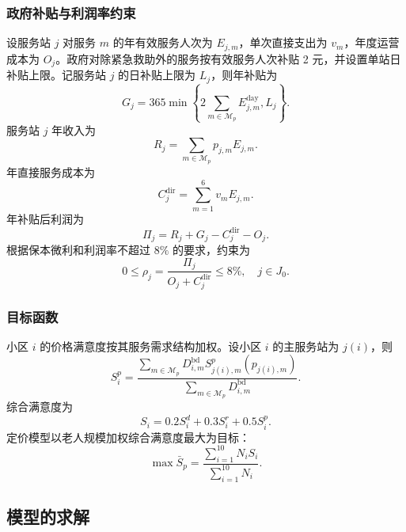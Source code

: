 \subsubsection{政府补贴与利润率约束}

设服务站 $j$ 对服务 $m$ 的年有效服务人次为 $E_{j,m}$，单次直接支出为 $v_m$，年度运营成本为 $O_j$。政府对除紧急救助外的服务按有效服务人次补贴 2 元，并设置单站日补贴上限。记服务站 $j$ 的日补贴上限为 $L_j$，则年补贴为
\begin{equation}
G_j=365\min\left\{2\sum_{m\in\mathcal{M}_p}E_{j,m}^{\mathrm{day}},L_j\right\}.
\end{equation}
服务站 $j$ 年收入为
\begin{equation}
R_j=\sum_{m\in\mathcal{M}_p}p_{j,m}E_{j,m}.
\end{equation}
年直接服务成本为
\begin{equation}
C_j^{\mathrm{dir}}=\sum_{m=1}^{6}v_mE_{j,m}.
\end{equation}
年补贴后利润为
\begin{equation}
\Pi_j=R_j+G_j-C_j^{\mathrm{dir}}-O_j.
\end{equation}
根据保本微利和利润率不超过 $8\%$ 的要求，约束为
\begin{equation}
0\leq \rho_j=\frac{\Pi_j}{O_j+C_j^{\mathrm{dir}}}\leq 8\%,\quad j\in J_0.
\end{equation}

\subsubsection{目标函数}

小区 $i$ 的价格满意度按其服务需求结构加权。设小区 $i$ 的主服务站为 $j(i)$，则
\begin{equation}
S_i^p=\frac{\sum_{m\in\mathcal{M}_p}D_{i,m}^{\mathrm{bd}}S_{j(i),m}^p(p_{j(i),m})}{\sum_{m\in\mathcal{M}_p}D_{i,m}^{\mathrm{bd}}}.
\end{equation}
综合满意度为
\begin{equation}
S_i=0.2S_i^d+0.3S_i^r+0.5S_i^p.
\end{equation}
定价模型以老人规模加权综合满意度最大为目标：
\begin{equation}
\max \bar{S}_p=\frac{\sum_{i=1}^{10}N_iS_i}{\sum_{i=1}^{10}N_i}.
\end{equation}

\subsection{模型的求解}

